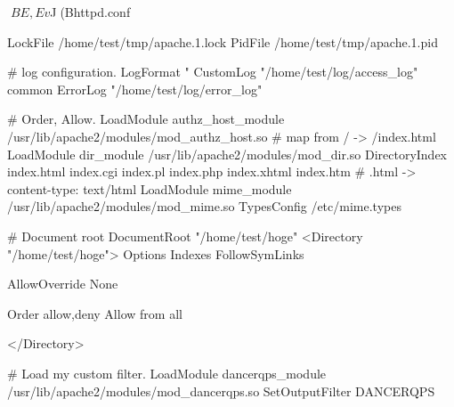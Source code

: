 {{{\begin{frame}[containsverbatim]{$BE,Ev$J(Bhttpd.conf}
\begin{commandline}
LockFile /home/test/tmp/apache.1.lock
PidFile /home/test/tmp/apache.1.pid

# log configuration.
LogFormat "%
CustomLog "/home/test/log/access_log" common
ErrorLog "/home/test/log/error_log"

# Order, Allow.
LoadModule authz_host_module /usr/lib/apache2/modules/mod_authz_host.so
# map from / -> /index.html
LoadModule dir_module /usr/lib/apache2/modules/mod_dir.so
DirectoryIndex index.html index.cgi index.pl index.php index.xhtml index.htm
# .html -> content-type: text/html
LoadModule mime_module /usr/lib/apache2/modules/mod_mime.so
TypesConfig /etc/mime.types

# Document root
DocumentRoot "/home/test/hoge"
<Directory "/home/test/hoge">
    Options Indexes FollowSymLinks

    AllowOverride None

    Order allow,deny
    Allow from all

</Directory>

# Load my custom filter.
LoadModule dancerqps_module /usr/lib/apache2/modules/mod_dancerqps.so
SetOutputFilter DANCERQPS
 \end{commandline}
\end{frame}



}}}
